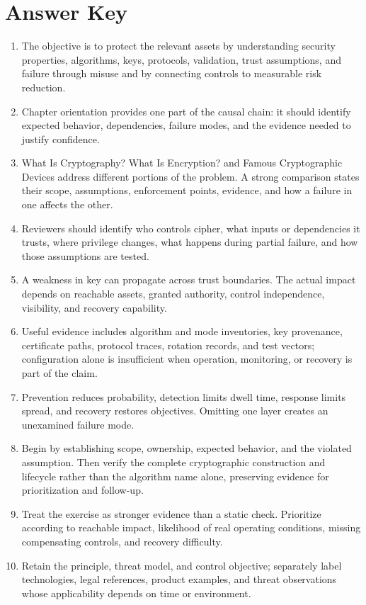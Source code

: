 \documentclass[11pt,letterpaper]{article}
\begin{document}
\section*{Answer Key}
\begin{enumerate}
\item The objective is to protect the relevant assets by understanding security properties, algorithms, keys, protocols, validation, trust assumptions, and failure through misuse and by connecting controls to measurable risk reduction.
\item Chapter orientation provides one part of the causal chain: it should identify expected behavior, dependencies, failure modes, and the evidence needed to justify confidence.
\item What Is Cryptography? What Is Encryption? and Famous Cryptographic Devices address different portions of the problem. A strong comparison states their scope, assumptions, enforcement points, evidence, and how a failure in one affects the other.
\item Reviewers should identify who controls cipher, what inputs or dependencies it trusts, where privilege changes, what happens during partial failure, and how those assumptions are tested.
\item A weakness in key can propagate across trust boundaries. The actual impact depends on reachable assets, granted authority, control independence, visibility, and recovery capability.
\item Useful evidence includes algorithm and mode inventories, key provenance, certificate paths, protocol traces, rotation records, and test vectors; configuration alone is insufficient when operation, monitoring, or recovery is part of the claim.
\item Prevention reduces probability, detection limits dwell time, response limits spread, and recovery restores objectives. Omitting one layer creates an unexamined failure mode.
\item Begin by establishing scope, ownership, expected behavior, and the violated assumption. Then verify the complete cryptographic construction and lifecycle rather than the algorithm name alone, preserving evidence for prioritization and follow-up.
\item Treat the exercise as stronger evidence than a static check. Prioritize according to reachable impact, likelihood of real operating conditions, missing compensating controls, and recovery difficulty.
\item Retain the principle, threat model, and control objective; separately label technologies, legal references, product examples, and threat observations whose applicability depends on time or environment.
\end{enumerate}
\end{document}
